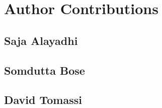 \section{Author Contributions}
\label{sec:author-contributions}

\subsection{Saja Alayadhi}

\subsection{Somdutta Bose}

\subsection{David Tomassi}
